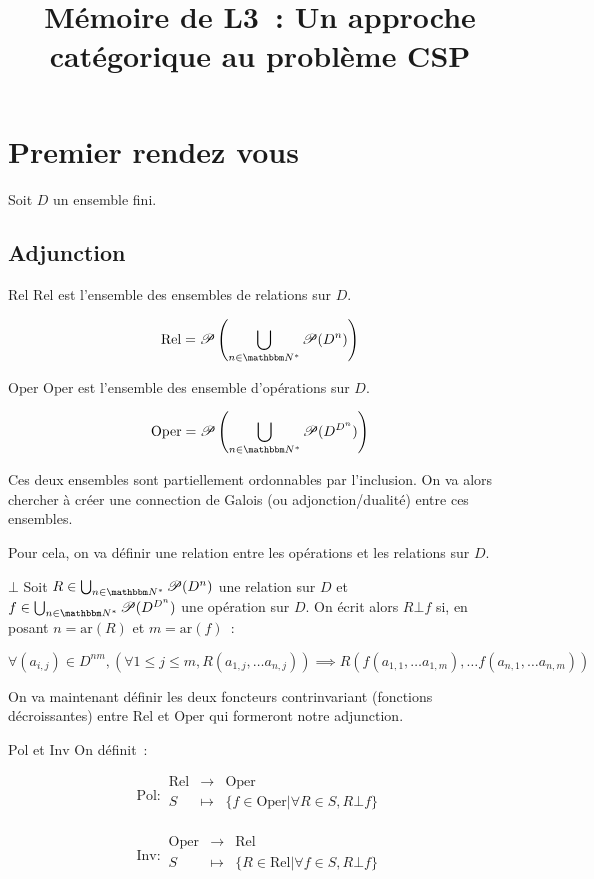 \documentclass[12pt]{article}
\title{Mémoire de L3~: Un approche catégorique au problème CSP}
\author{}
\newcommand\Rel{\text{Rel}}
\newcommand\Oper{\text{Oper}}
\newcommand\Inv{\text{Inv}}
\newcommand\Pol{\text{Pol}}
\renewcommand\P{\mathscr{P}}
\newcommand\ar{\text{ar}}
\begin{document}
\maketitle

\section{Premier rendez vous}

Soit $D$ un ensemble fini.


\subsection{Adjunction}

\begin{defi}{$\Rel$}
    $\Rel$ est l'ensemble des ensembles de relations sur $D$.

    \[\Rel = \P\left(\bigcup_{n\in\N^*} \P(D^n)\right)\]
\end{defi}

\begin{defi}{$\Oper$}
    $\Oper$ est l'ensemble des ensemble d'opérations sur $D$.

    \[\Oper = \P\left(\bigcup_{n\in\N^*} \P(D^{D^n})\right)\]
\end{defi}

Ces deux ensembles sont partiellement ordonnables par l'inclusion. On va alors
chercher à créer une connection de Galois (ou adjonction/dualité) entre ces
ensembles.

Pour cela, on va définir une relation entre les opérations et les relations sur $D$.

\begin{defi}{$\bot$} Soit $R\in \bigcup_{n\in\N^*} \P(D^n)$ une relation sur $D$
    et $f\in\bigcup_{n\in\N^*} \P(D^{D^n})$ une opération sur $D$. On écrit alors
    $R\bot f$ si, en posant $n = \ar(R)$ et $m = \ar(f)$~:

    \[ \forall (a_{i,j})\in D^{nm}, (\forall 1\leq j\leq m, R(a_{1,j}, \dots a_{n, j}))
         \implies R(f(a_{1,1}, \dots a_{1,m}), \dots f(a_{n,1}, \dots a_{n,m})) \]
\end{defi}

On va maintenant définir les deux foncteurs contrinvariant (fonctions décroissantes)
entre $\Rel$ et $\Oper$ qui formeront notre adjunction.

\begin{defi}{$\Pol$ et $\Inv$}
    On définit~:

    \[\Pol:\begin{array}{rcl}\Rel & \rightarrow & \Oper \\
        S & \mapsto & \{f\in\Oper | \forall R\in S, R\bot f\} \\
    \end{array}\]

    \[\Inv:\begin{array}{rcl}\Oper & \rightarrow & \Rel \\
        S & \mapsto & \{R\in\Rel | \forall f\in S, R\bot f\} \\
    \end{array}\]
\end{defi}
\end{document}
